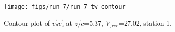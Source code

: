 \begin{figure}[H]
\centering
\texttt{[image: figs/run\_7/run\_7\_tw\_contour]}
\caption{Contour plot of $\overline{v_{\theta}^{\prime} v_{z}^{\prime}}$ at $z/c$=5.37, $V_{free}$=27.02, station 1.}
\label{fig:run_7_tw_contour}
\end{figure}


